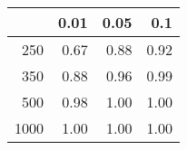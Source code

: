 % 
\begin{tabular}{rrrr}
  \hline
 & 0.01 & 0.05 & 0.1 \\ 
  \hline
250 & 0.67 & 0.88 & 0.92 \\ 
  350 & 0.88 & 0.96 & 0.99 \\ 
  500 & 0.98 & 1.00 & 1.00 \\ 
  1000 & 1.00 & 1.00 & 1.00 \\ 
   \hline
\end{tabular}
